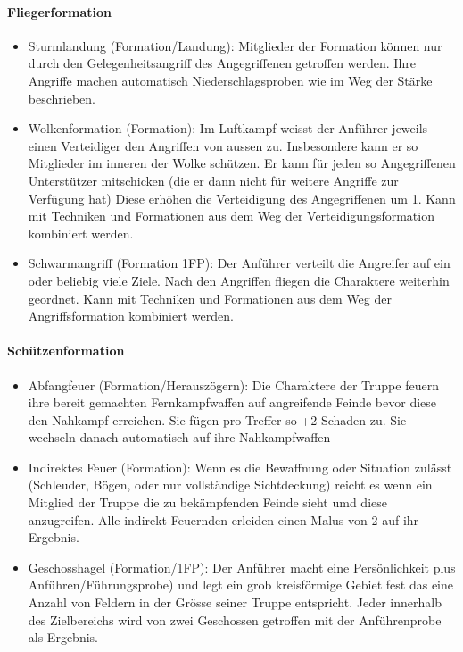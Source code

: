 \documentclass{article}
\begin{document}
\paragraph{Fliegerformation}

\begin{itemize}
\item Sturmlandung (Formation/Landung): Mitglieder der Formation können nur durch den Gelegenheitsangriff des Angegriffenen getroffen werden. Ihre Angriffe machen automatisch Niederschlagsproben wie im Weg der Stärke beschrieben.
\item Wolkenformation (Formation): Im Luftkampf weisst der Anführer jeweils einen Verteidiger den Angriffen von aussen zu. Insbesondere kann er so Mitglieder im inneren der Wolke schützen. Er kann für jeden so Angegriffenen Unterstützer mitschicken (die er dann nicht für weitere Angriffe zur Verfügung hat) Diese erhöhen die Verteidigung des Angegriffenen um 1. Kann mit Techniken und Formationen aus dem Weg der Verteidigungsformation kombiniert werden.
\item Schwarmangriff (Formation 1FP): Der Anführer verteilt die Angreifer auf ein oder beliebig viele Ziele. Nach den Angriffen fliegen die Charaktere weiterhin geordnet. Kann mit Techniken und Formationen aus dem Weg der Angriffsformation kombiniert werden.
\end{itemize}

\paragraph{Schützenformation}

\begin{itemize}
\item Abfangfeuer (Formation/Herauszögern): Die Charaktere der Truppe feuern ihre bereit gemachten Fernkampfwaffen auf angreifende Feinde bevor diese den Nahkampf erreichen. Sie fügen pro Treffer so +2 Schaden zu. Sie wechseln danach automatisch auf ihre Nahkampfwaffen
\item Indirektes Feuer (Formation): Wenn es die Bewaffnung oder Situation zulässt (Schleuder, Bögen, oder nur vollständige Sichtdeckung) reicht es wenn ein Mitglied der Truppe die zu bekämpfenden Feinde sieht umd diese anzugreifen. Alle indirekt Feuernden erleiden einen Malus von 2 auf ihr Ergebnis.
\item Geschosshagel (Formation/1FP): Der Anführer macht eine Persönlichkeit plus Anführen/Führungsprobe) und legt ein grob kreisförmige Gebiet fest das eine Anzahl von Feldern in der Grösse seiner Truppe entspricht. Jeder innerhalb des Zielbereichs wird von zwei Geschossen getroffen mit der Anführenprobe als Ergebnis.
\end{itemize}
\end{document}
